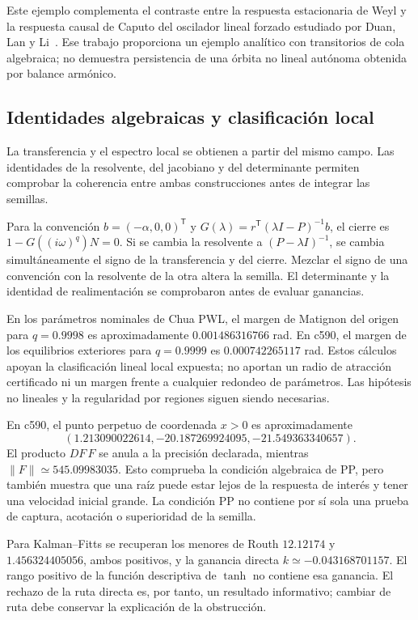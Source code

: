 Este ejemplo complementa el contraste entre la respuesta estacionaria de
Weyl y la respuesta causal de Caputo del oscilador lineal forzado estudiado
por Duan, Lan y Li~\cite{DuanLanLi2022WeylCaputo}. Ese trabajo proporciona un
ejemplo analítico con transitorios de cola algebraica; no demuestra
persistencia de una órbita no lineal autónoma obtenida por balance armónico.

\subsection{Identidades algebraicas y clasificación local}

La transferencia y el espectro local se obtienen a partir del mismo campo.
Las identidades de la resolvente, del jacobiano y del determinante permiten
comprobar la coherencia entre ambas construcciones antes de integrar las
semillas.

Para la convención $b=(-\alpha,0,0)^{\mathsf T}$ y
$G(\lambda)=r^{\mathsf T}(\lambda I-P)^{-1}b$, el cierre es
$1-G((i\omega)^q)N=0$. Si se cambia la resolvente a
$(P-\lambda I)^{-1}$, se cambia simultáneamente el signo de la transferencia
y del cierre. Mezclar el signo de una convención con la resolvente de la otra
altera la semilla. El determinante y la identidad de realimentación se
comprobaron antes de evaluar ganancias.

En los parámetros nominales de Chua PWL, el margen de Matignon del origen
para $q=0.9998$ es aproximadamente $0.001486316766$ rad. En c590, el margen
de los equilibrios exteriores para $q=0.9999$ es $0.000742265117$ rad.
Estos cálculos apoyan la clasificación lineal local expuesta; no aportan un
radio de atracción certificado ni un margen frente a cualquier redondeo de
parámetros. Las hipótesis no lineales y la regularidad por regiones siguen
siendo necesarias.

En c590, el punto perpetuo de coordenada $x>0$ es aproximadamente
\[
 (1.213090022614,-20.187269924095,-21.549363340657).
\]
El producto $DF\,F$ se anula a la precisión declarada, mientras
$\|F\|\simeq545.09983035$. Esto comprueba la condición algebraica de PP,
pero también muestra que una raíz puede estar lejos de la respuesta de
interés y tener una velocidad inicial grande. La condición PP no contiene
por sí sola una prueba de captura, acotación o superioridad de la semilla.

Para Kalman--Fitts se recuperan los menores de Routh
$12.12174$ y $1.456324405056$, ambos positivos, y la ganancia directa
$k\simeq-0.043168701157$. El rango positivo de la función descriptiva de
$\tanh$ no contiene esa ganancia. El rechazo de la ruta directa es, por
tanto, un resultado informativo; cambiar de ruta debe conservar la
explicación de la obstrucción.


